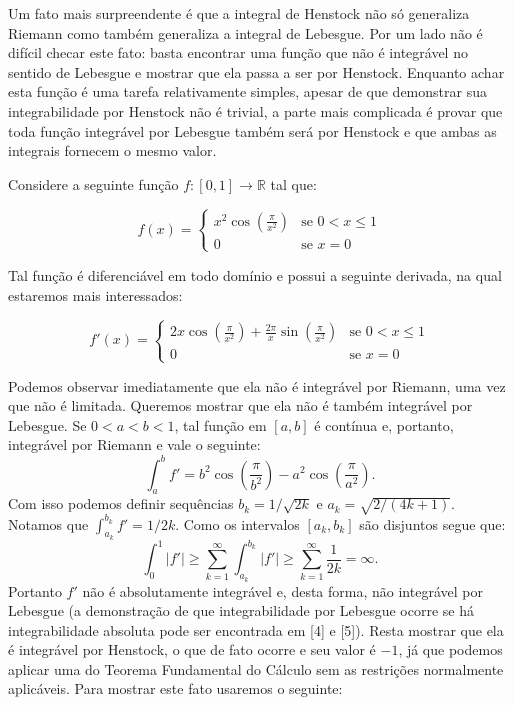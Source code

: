 \documentclass[12pt, a4paper]{article}
\theoremstyle{definition}
\begin{document}
Um fato mais surpreendente é que a integral de Henstock não só generaliza Riemann como também generaliza a integral de Lebesgue. Por um lado não é difícil checar este fato: basta encontrar uma função que não é integrável no sentido de Lebesgue e mostrar que ela passa a ser por Henstock. Enquanto achar esta função é uma tarefa relativamente simples, apesar de que demonstrar sua integrabilidade por Henstock não é trivial, a parte mais complicada é provar que toda função integrável por Lebesgue também será por Henstock e que ambas as integrais fornecem o mesmo valor. 

Considere a seguinte função $f:[0,1]\rightarrow \mathbb{R}$ tal que:  

$$ f(x) = \left\{
\begin{array}{ll}
x^2\cos \left(\frac{\pi}{x^2}\right)  & \mbox{se } 0 < x \leq 1 \\
0 & \mbox{se } x=0
\end{array}
\right. $$

Tal função é diferenciável em todo domínio e possui a seguinte derivada, na qual estaremos mais interessados:

$$ f'(x) = \left\{
\begin{array}{ll}
2x\cos \left(\frac{\pi}{x^2}\right) +\frac{2\pi}{x}\sin \left(\frac{\pi}{x^2}\right)   & \mbox{se } 0 < x \leq 1 \\
0 & \mbox{se } x=0
\end{array}
\right. $$

Podemos observar imediatamente que ela não é integrável por Riemann, uma vez que não é limitada. Queremos mostrar que ela não é também integrável por Lebesgue. Se $0<a<b<1$, tal função em $[a,b]$ é contínua e, portanto, integrável por Riemann e vale o seguinte: $$\int_a^b f'=b^2\cos \left(\frac{\pi}{b^2}\right) - a^2\cos \left(\frac{\pi}{a^2}\right).$$ Com isso podemos definir sequências $b_k=1/\sqrt{2k}$ e $a_k=\sqrt{2/(4k+1)}$. Notamos que $\int_{a_k}^{b_k} f'=1/2k$. Como os intervalos $[a_k,b_k]$ são disjuntos segue que: $$\int_0^1 |f'|\geq \sum_{k=1}^{\infty} \int_{a_k}^{b_k} |f'|\geq  \sum_{k=1}^{\infty} \frac{1}{2k}=\infty.$$ Portanto $f'$ não é absolutamente integrável e, desta forma, não integrável por Lebesgue (a demonstração de que integrabilidade por Lebesgue ocorre se há integrabilidade absoluta pode ser encontrada em [4] e [5]). Resta mostrar que ela é integrável por Henstock, o que de fato ocorre e seu valor é $-1$, já que podemos aplicar uma do Teorema Fundamental do Cálculo sem as restrições normalmente aplicáveis. Para mostrar este fato usaremos o seguinte:
\end{document}
